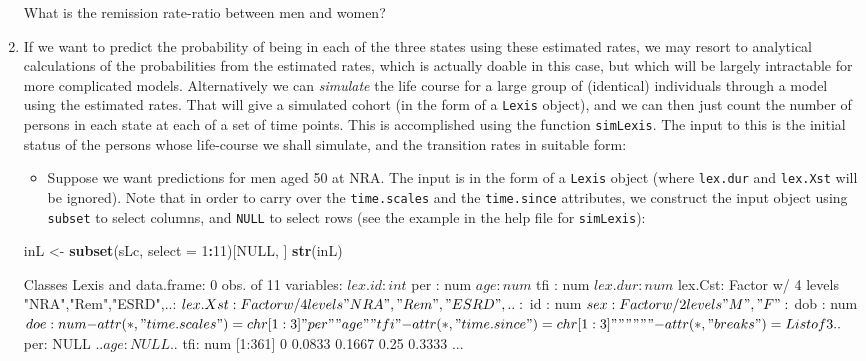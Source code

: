\documentclass[
]{book}
\newenvironment{Shaded}{\begin{snugshade}}{\end{snugshade}}
\newcommand{\AttributeTok}[1]{\textcolor[rgb]{0.13,0.29,0.53}{#1}}
\newcommand{\ConstantTok}[1]{\textcolor[rgb]{0.56,0.35,0.01}{#1}}
\newcommand{\DecValTok}[1]{\textcolor[rgb]{0.00,0.00,0.81}{#1}}
\newcommand{\FunctionTok}[1]{\textcolor[rgb]{0.13,0.29,0.53}{\textbf{#1}}}
\newcommand{\NormalTok}[1]{#1}
\newcommand{\OtherTok}[1]{\textcolor[rgb]{0.56,0.35,0.01}{#1}}
\newcommand{\SpecialCharTok}[1]{\textcolor[rgb]{0.81,0.36,0.00}{\textbf{#1}}}
\providecommand{\tightlist}{%
  \setlength{\itemsep}{0pt}\setlength{\parskip}{0pt}}
\begin{document}
\begin{enumerate}
  What is the remission rate-ratio between men and women?
\item
  If we want to predict the probability of being in each of the
  three states using these estimated rates, we may resort to
  analytical calculations of the probabilities from the estimated
  rates, which is actually doable in this case, but which will be largely
  intractable for more complicated models.
  Alternatively we can \emph{simulate} the life course for a large
  group of (identical) individuals through a model using the estimated
  rates. That will give a simulated cohort (in the form of a
  \texttt{Lexis} object), and we can then just count the number of
  persons in each state at each of a set of time points.
  This is accomplished using the function \texttt{simLexis}. The input
  to this is the initial status of the persons whose life-course we
  shall simulate, and the transition rates in suitable form:

  \begin{itemize}
  \tightlist
  \item
    Suppose we want predictions for men aged 50 at
    NRA. The input is in the form of a \texttt{Lexis} object (where
    \texttt{lex.dur} and \texttt{lex.Xst} will be ignored). Note that in
    order to carry over the \texttt{time.scales} and the
    \texttt{time.since} attributes, we construct the input object using
    \texttt{subset} to select columns, and \texttt{NULL} to select rows
    (see the example in the help file for \texttt{simLexis}):
  \end{itemize}

\begin{Shaded}
\begin{Highlighting}[]
\NormalTok{inL }\OtherTok{\textless{}{-}} \FunctionTok{subset}\NormalTok{(sLc, }\AttributeTok{select =} \DecValTok{1}\SpecialCharTok{:}\DecValTok{11}\NormalTok{)[}\ConstantTok{NULL}\NormalTok{, ]}
\FunctionTok{str}\NormalTok{(inL)}
\end{Highlighting}
\end{Shaded}

\begin{Shaded}
\begin{Highlighting}[]
\NormalTok{Classes \textquotesingle{}Lexis\textquotesingle{} and \textquotesingle{}data.frame\textquotesingle{}:   0 obs. of  11 variables:}
\NormalTok{ $ lex.id : int }
\NormalTok{ $ per    : num }
\NormalTok{ $ age    : num }
\NormalTok{ $ tfi    : num }
\NormalTok{ $ lex.dur: num }
\NormalTok{ $ lex.Cst: Factor w/ 4 levels "NRA","Rem","ESRD",..: }
\NormalTok{ $ lex.Xst: Factor w/ 4 levels "NRA","Rem","ESRD",..: }
\NormalTok{ $ id     : num }
\NormalTok{ $ sex    : Factor w/ 2 levels "M","F": }
\NormalTok{ $ dob    : num }
\NormalTok{ $ doe    : num }
\NormalTok{ {-} attr(*, "time.scales")= chr [1:3] "per" "age" "tfi"}
\NormalTok{ {-} attr(*, "time.since")= chr [1:3] "" "" ""}
\NormalTok{ {-} attr(*, "breaks")=List of 3}
\NormalTok{  ..$ per: NULL}
\NormalTok{  ..$ age: NULL}
\NormalTok{  ..$ tfi: num [1:361] 0 0.0833 0.1667 0.25 0.3333 ...}
\end{Highlighting}
\end{Shaded}


\end{enumerate}
\end{document}
